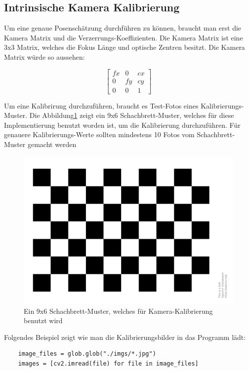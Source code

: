 \subsection{Intrinsische Kamera Kalibrierung}

Um eine genaue Posenschätzung durchführen zu können, braucht man erst die Kamera Matrix und die Verzerrungs-Koeffizienten. 
Die Kamera Matrix ist eine 3x3 Matrix, welches die Fokus Länge und optische Zentren besitzt. 
Die Kamera Matrix würde so aussehen:

\[
\begin{bmatrix}
fx & 0 & cx \\ 
0 & fy & cy \\ 
0 & 0  & 1 
\end{bmatrix}
\]

Um eine Kalibrirung durchzuführen, braucht es Test-Fotos eines Kalibrierungs-Muster. 
Die Abbildung\ref{fig:pattern} zeigt ein 9x6 Schachbrett-Muster, welches für diese Implementierung benutzt worden ist, um die Kalibrierung durchzuführen.
Für genauere Kalibrierungs-Werte sollten mindestens 10 Fotos vom Schachbrett-Muster gemacht werden \cite{noauthor_opencv_nodate-2}


\begin{figure}[H]
    \centering
    \includegraphics[width=0.5\linewidth]{graphics/pattern.png}
    \caption{Ein 9x6 Schachbrett-Muster, welches für Kamera-Kalibrierung benutzt wird}
    \label{fig:pattern}
\end{figure}

Folgendes Beispiel zeigt wie man die Kalibrierungsbilder in das Programm lädt:


\begin{lstlisting}
    image_files = glob.glob("./imgs/*.jpg")
    images = [cv2.imread(file) for file in image_files]
\end{lstlisting}


